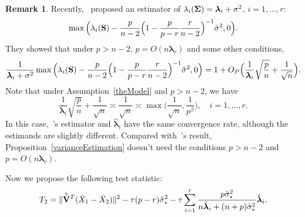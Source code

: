 \documentclass[3p]{elsarticle}
\newcommand{\bfsym}[1]{\ensuremath{\boldsymbol{#1}}}
\def\blambda {\bfsym {\lambda}}        \def\bLambda {\bfsym {\Lambda}}
\theoremstyle{plain}
\theoremstyle{definition}
\newtheorem{remark}{\quad\quad Remark}
\theoremstyle{remark}
\begin{document}
\begin{remark}
    Recently,~\cite{Fan2015Asymptotics} proposed an estimator of
    $\lambda_i(\bSigma)=\blambda_i+\sigma^2$, $i=1,\ldots, r$:
    $$
    \max\Big(\lambda_i(\mathbf{S})-\frac{p}{n-2}\Big(1-\frac{p}{p-r}\frac{r}{n-2}\Big)^{-1}\hat{\sigma}^2,0\Big).
    $$
    They showed that under $p>n-2$, $p=O(n\blambda_r)$ and some other conditions,
    $$
    \frac{1}{\blambda_i+\sigma^2}\max\Big(\lambda_i(\BS)-\frac{p}{n-2}\Big(1-\frac{p}{p-r}\frac{r}{n-2}\Big)^{-1}\hat{\sigma}^2,0\Big)
    =1+O_P\Big(\frac{1}{\blambda_i}\sqrt{\frac{p}{n}}+\frac{1}{\sqrt{n}}\Big).
    $$
    Note that under Assumption~\ref{theModel} and $p>n-2$, we have
    $$
\frac{1}{\blambda_i}\sqrt{\frac{p}{n}}+\frac{1}{\sqrt{n}}\asymp
\frac{1}{\sqrt{n}}
\asymp
        \max\big(\frac{1}{\sqrt{n}},\frac{1}{p^{\beta}}\big),\quad i=1,\ldots,r.
    $$
    In this case,~\cite{Fan2015Asymptotics}'s estimator and $\hat{\blambda}_i$ have the same convergence rate, although the estimands are slightly different.
    Compared with~\cite{Fan2015Asymptotics}'s result, Proposition~\ref{varianceEstimation} doesn't need the conditions $p>n-2$ and $p=O(n\blambda_r)$.
\end{remark}


Now we propose the following test statistic:
$$
T_2=
\|\hat{\tilde{\BV}}^T (\bar{X}_1-\bar{X}_2)\|^2
-
\tau(p-r)\hat{\sigma}_*^2 
- \tau\sum_{i=1}^r \frac{p\hat{\sigma}_*^2}{n\hat{\blambda}_i+(n+p)\hat{\sigma}_*^2}\hat{\blambda}_i.
$$
\end{document}
